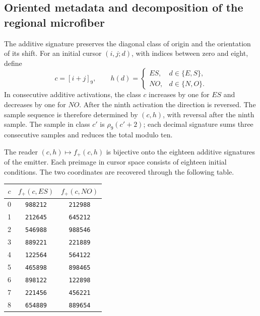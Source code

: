 \subsection{Oriented metadata and decomposition of the regional microfiber}
\label{sec:microfibra-bipartita-explicita}

The additive signature preserves the diagonal class of origin and the orientation
of its shift. For an initial cursor $(i,j;d)$, with indices between
zero and eight, define
\[
 c=[i+j]_9,\qquad
 h(d)=\begin{cases}ES,&d\in\{E,S\},\\NO,&d\in\{N,O\}.
 \end{cases}
\]
In consecutive additive activations, the class $c$ increases by one
for $ES$ and decreases by one for $NO$. After the ninth activation the
direction is reversed. The sample sequence is therefore determined
by $(c,h)$, with reversal after the ninth sample. The sample
in class $c'$ is $\rho_9(c'+2)$; each decimal signature sums three consecutive
samples and reduces the total modulo ten.

\begin{proposition}
The reader $(c,h)\mapsto f_+(c,h)$ is bijective onto the eighteen
additive signatures of the emitter. Each preimage in cursor space
consists of eighteen initial conditions. The two coordinates are
recovered through the following table.
\end{proposition}

\begin{center}
\begin{tabular}{c|cc}
\toprule
$c$&$f_+(c,ES)$&$f_+(c,NO)$\\
\midrule
0&\texttt{988212}&\texttt{212988}\\
1&\texttt{212645}&\texttt{645212}\\
2&\texttt{546988}&\texttt{988546}\\
3&\texttt{889221}&\texttt{221889}\\
4&\texttt{122564}&\texttt{564122}\\
5&\texttt{465898}&\texttt{898465}\\
6&\texttt{898122}&\texttt{122898}\\
7&\texttt{221456}&\texttt{456221}\\
8&\texttt{654889}&\texttt{889654}\\
\bottomrule
\end{tabular}
\end{center}

